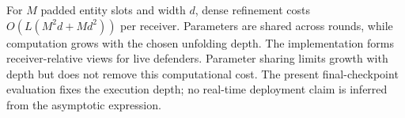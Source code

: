 For $M$ padded entity slots and width $d$, dense refinement costs $O(L(M^2d+Md^2))$ per receiver. Parameters are shared across rounds, while computation grows with the chosen unfolding depth. The implementation forms receiver-relative views for live defenders. Parameter sharing limits growth with depth but does not remove this computational cost. The present final-checkpoint evaluation fixes the execution depth; no real-time deployment claim is inferred from the asymptotic expression.
